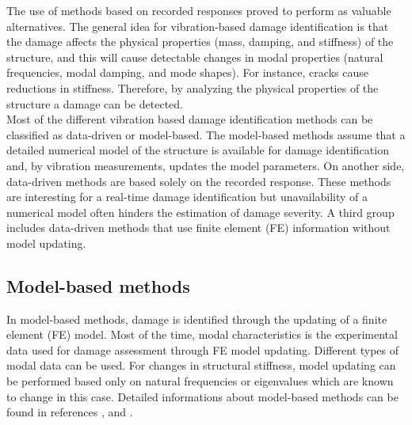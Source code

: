 \documentclass[journal]{IEEEtran}
\begin{document}
The use of methods based on recorded responses proved to perform as valuable alternatives. 
The general idea for vibration-based damage identification is that the damage affects the physical properties (mass, damping, and stiffness) of the structure, and this will cause detectable changes in modal properties (natural frequencies, modal damping, and mode shapes). 
For instance, cracks cause reductions in stiffness. Therefore, by analyzing the physical properties of the structure a damage can be detected.
\\

Most of the different vibration based damage identification methods can be classified as data-driven or model-based.
 The model-based methods assume that a detailed numerical model of the structure is available for damage identification and, by vibration measurements, updates the model parameters.
 On another side, data-driven methods are based solely on the recorded response. These methods are interesting for a real-time damage identification but unavailability of a numerical model often hinders the estimation of damage severity.
 A third group includes data-driven methods that use finite element (FE) information without model updating.

\subsection{Model-based methods}  

In model-based methods, damage is identified through the updating of a finite element (FE) model.
 Most of the time, modal characteristics is the experimental data used for damage assessment through FE model updating.%
 Different types of modal data can be used. For changes in structural stiffness, model updating can be performed based only on natural frequencies or eigenvalues which are known to change in this case.
 Detailed informations about model-based methods can be found in references  %
\cite{fritzen1998damage},
\cite{teughels2005damage} and
\cite{simoen2015dealing}.
\end{document}

